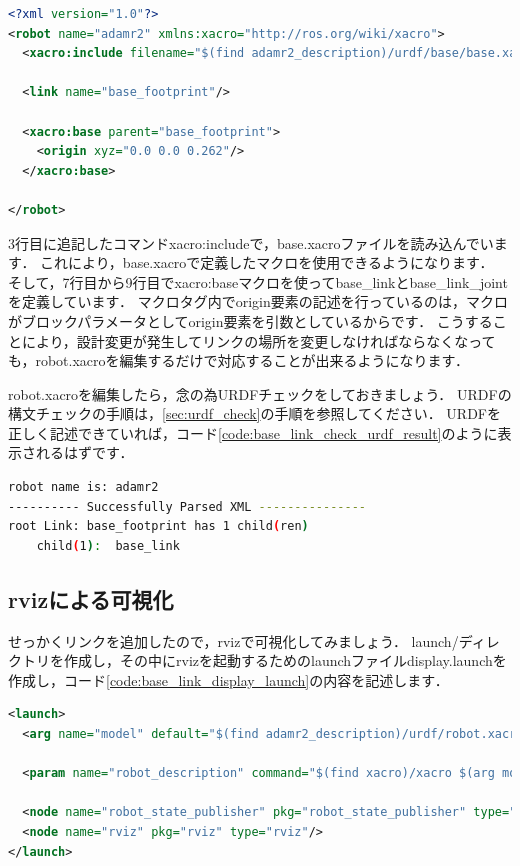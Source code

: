 \documentclass[{../../master}]{subfiles}
\begin{document}
\begin{lstlisting}[language=XML, label=code:robot_xacro_add_base_link, caption=Add \textsf{base\_link} to Robot Model]
<?xml version="1.0"?>
<robot name="adamr2" xmlns:xacro="http://ros.org/wiki/xacro">
  <xacro:include filename="$(find adamr2_description)/urdf/base/base.xacro"/>

  <link name="base_footprint"/>

  <xacro:base parent="base_footprint">
    <origin xyz="0.0 0.0 0.262"/>
  </xacro:base>

</robot>
\end{lstlisting}

3行目に追記したコマンド\textsf{xacro:include}で，\textsf{base.xacro}ファイルを読み込んでいます．
これにより，\textsf{base.xacro}で定義したマクロを使用できるようになります．
そして，7行目から9行目で\textsf{xacro:base}マクロを使って\textsf{base\_link}と\textsf{base\_link\_joint}を定義しています．
マクロタグ内で\textsf{origin}要素の記述を行っているのは，マクロがブロックパラメータとして\textsf{origin}要素を引数としているからです．
こうすることにより，設計変更が発生してリンクの場所を変更しなければならなくなっても，\textsf{robot.xacro}を編集するだけで対応することが出来るようになります．

\textsf{robot.xacro}を編集したら，念の為URDFチェックをしておきましょう．
URDFの構文チェックの手順は，\ref{sec:urdf_check}の手順を参照してください．
URDFを正しく記述できていれば，コード\ref{code:base_link_check_urdf_result}のように表示されるはずです．

\begin{lstlisting}[language=sh, label=code:base_link_check_urdf_result, caption=Result of Check URDF]
robot name is: adamr2
---------- Successfully Parsed XML ---------------
root Link: base_footprint has 1 child(ren)
    child(1):  base_link  
\end{lstlisting}

\subsection{\textsf{rviz}による可視化}
\label{sec:base_link_visualize_by_rviz}

せっかくリンクを追加したので，\textsf{rviz}で可視化してみましょう．
\textsf{launch/}ディレクトリを作成し，その中に\textsf{rviz}を起動するためのlaunchファイル\textsf{display.launch}を作成し，コード\ref{code:base_link_display_launch}の内容を記述します．

\begin{lstlisting}[language=XML, label=code:base_link_display_launch, caption=\textsf{display.launch}]
<launch>
  <arg name="model" default="$(find adamr2_description)/urdf/robot.xacro"/>

  <param name="robot_description" command="$(find xacro)/xacro $(arg model)"/>

  <node name="robot_state_publisher" pkg="robot_state_publisher" type="robot_state_publisher"/>
  <node name="rviz" pkg="rviz" type="rviz"/>
</launch>
\end{lstlisting}
\end{document}
